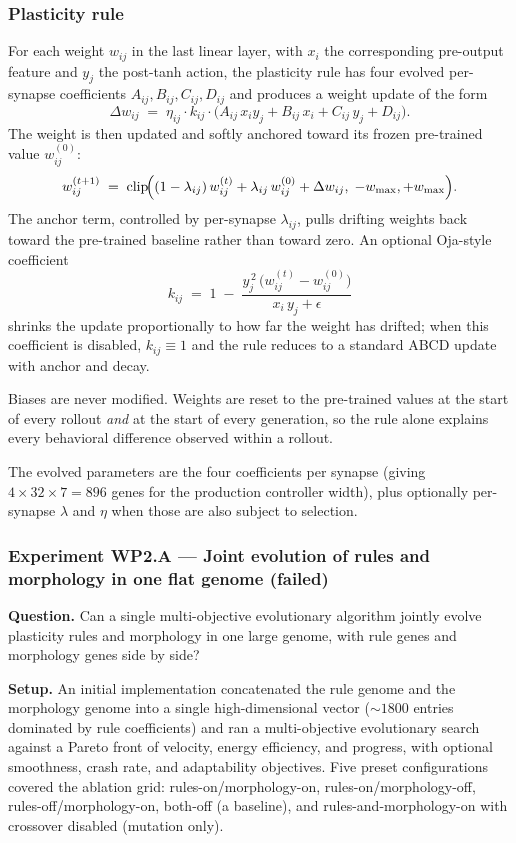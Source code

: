 \documentclass[letterpaper,10pt]{article}
\begin{document}
\subsubsection{Plasticity rule}
For each weight $w_{ij}$ in the last linear layer, with $x_i$ the corresponding pre-output feature and $y_j$ the post-tanh action, the plasticity rule has four evolved per-synapse coefficients $A_{ij}, B_{ij}, C_{ij}, D_{ij}$ and produces a weight update of the form
\[
    \Delta w_{ij}
    \;=\; \eta_{ij} \cdot k_{ij} \cdot \bigl(A_{ij}\,x_i y_j + B_{ij}\,x_i + C_{ij}\,y_j + D_{ij}\bigr) .
\]
The weight is then updated and softly anchored toward its frozen pre-trained value $w^{(0)}_{ij}$:
\[
    w^{(t+1)}_{ij}
    \;=\; \mathrm{clip}\!\Bigl(
        (1 - \lambda_{ij})\,w^{(t)}_{ij}
        + \lambda_{ij}\,w^{(0)}_{ij}
        + \Delta w_{ij},
        \;-w_{\max}, +w_{\max}
    \Bigr) .
\]
The anchor term, controlled by per-synapse $\lambda_{ij}$, pulls drifting weights back toward the pre-trained baseline rather than toward zero. An optional Oja-style coefficient
\[
    k_{ij} \;=\; 1 \;-\; \frac{y_j^{\,2}\,\bigl(w^{(t)}_{ij} - w^{(0)}_{ij}\bigr)}{x_i\,y_j + \epsilon}
\]
shrinks the update proportionally to how far the weight has drifted; when this coefficient is disabled, $k_{ij} \equiv 1$ and the rule reduces to a standard ABCD update with anchor and decay.

Biases are never modified. Weights are reset to the pre-trained values at the start of every rollout \emph{and} at the start of every generation, so the rule alone explains every behavioral difference observed within a rollout.

The evolved parameters are the four coefficients per synapse (giving $4 \times 32 \times 7 = 896$ genes for the production controller width), plus optionally per-synapse $\lambda$ and $\eta$ when those are also subject to selection.

\subsubsection{Experiment WP2.A --- Joint evolution of rules and morphology in one flat genome (failed)}
\textbf{Question.} Can a single multi-objective evolutionary algorithm jointly evolve plasticity rules and morphology in one large genome, with rule genes and morphology genes side by side?

\textbf{Setup.} An initial implementation concatenated the rule genome and the morphology genome into a single high-dimensional vector ($\sim 1800$ entries dominated by rule coefficients) and ran a multi-objective evolutionary search against a Pareto front of velocity, energy efficiency, and progress, with optional smoothness, crash rate, and adaptability objectives. Five preset configurations covered the ablation grid: rules-on/morphology-on, rules-on/morphology-off, rules-off/morphology-on, both-off (a baseline), and rules-and-morphology-on with crossover disabled (mutation only).
\end{document}
